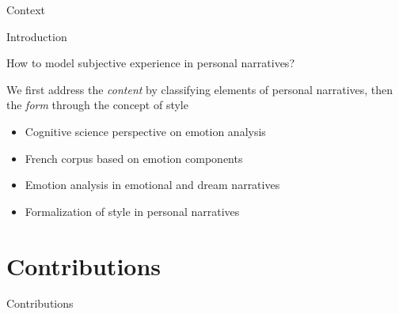 \documentclass[handout,10pt]{beamer}
\begin{document}
\begin{frame}{Context}

\end{frame}


\begin{frame}{Introduction}

How to model subjective experience in personal narratives?

\vspace{0.25cm}
\pause

We first address the \textit{content} by classifying elements of personal narratives, then the \textit{form} through the concept of style

\vspace{0.25cm}
\pause

\begin{itemize}[<+->]
    \item Cognitive science perspective on emotion analysis
    \item French corpus based on emotion components
    \item Emotion analysis in emotional and dream narratives 
    \item Formalization of style in personal narratives
\end{itemize}




    
\end{frame}

\section{Contributions}
\begin{frame}{}
\Large
\vfill
\begin{center}
    Contributions
\end{center}
\vfill
\end{frame}
\end{document}
